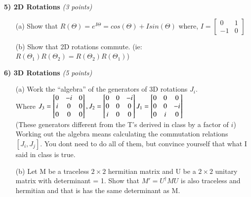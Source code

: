 {\newpage

\textbf{5) 2D Rotations } \hfill \textit{(3 points)}
\begin{itemize}
\item[(a)]Show that $R(\Theta) = e^{I\Theta} = cos(\Theta)+ I sin(\Theta)$
where, $I =  \begin{bmatrix}
    0 & 1  \\
    -1 & 0
  \end{bmatrix} $

\item[(b)]Show that 2D rotations commute.  (ie: $R(\Theta_{1})R(\Theta_{2}) = R(\Theta_{2})R(\Theta_{1})$)
\end{itemize}
}

\vspace*{0.25in}

\textbf{6) 3D Rotations } \hfill \textit{(5 points)}
\begin{itemize}
\item[(a)]Work the ``algebra'' of the generators of 3D rotations $J_i$. \\
Where $
J_3 =  \begin{bmatrix}    0 & -i & 0  \\ i & 0  & 0 \\ 0 & 0 & 0 \end{bmatrix}, 
\hfill
 J_2 =  \begin{bmatrix}    0 & 0 & -i  \\ 0 & 0  & 0 \\ i & 0 & 0 \end{bmatrix} 
\hfill
 J_1 =  \begin{bmatrix}    0 & 0 & 0  \\ 0 & 0  & -i \\ 0 & i & 0 \end{bmatrix} 
$\\
(These generators different from the T's derived in class by a factor of $i$)\\
Working out the algebra means calculating the commutation relations $[J_i,J_j]$.
You dont need to do all of them, but convince yourself that what I said in class is true. 
\item[(b)]Let M be a traceless $2\times2$ hermitian matrix and U be a $2\times2$  unitary matrix with determinant = 1.  
Show that $M' = U^{\dagger}MU$ is also traceless and hermitian and that is has the same determinant as M.
\end{itemize}




